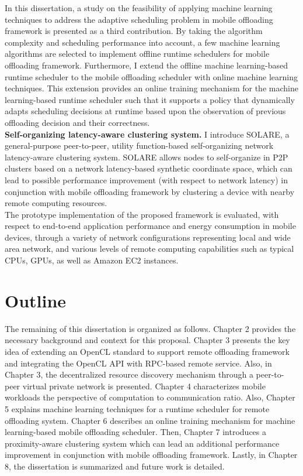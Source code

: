 %
In this dissertation, a study on the feasibility of applying machine
learning techniques to address the adaptive scheduling problem in mobile
offloading framework is presented as a third contribution.
%
By taking the algorithm complexity and scheduling performance into
account, a few machine learning algorithms are selected to implement
offline runtime schedulers for mobile offloading framework.
%
Furthermore, I extend the offline machine learning-based runtime
scheduler to the mobile offloading scheduler with online machine
learning techniques.
%
This extension provides an online training mechanism for the machine
learning-based runtime scheduler such that it supports a policy that
dynamically adapts scheduling decisions at runtime based upon the
observation of previous offloading decision and their correctness.\\
%
{\bf Self-organizing latency-aware clustering system.} I introduce
SOLARE, a general-purpose peer-to-peer, utility function-based
self-organizing network latency-aware clustering system.
%
SOLARE allows nodes to self-organize in P2P clusters based on a network
latency-based synthetic coordinate space, which can lead to possible
performance improvement (with respect to network latency) in conjunction
with mobile offloading framework by clustering a device with nearby
remote computing resources.\\ 
%
The prototype implementation of the proposed framework is evaluated,
with respect to end-to-end application performance and energy consumption
in mobile devices, through a variety of network configurations
representing local and wide area network, and various levels of remote
computing capabilities such as typical CPUs, GPUs, as well as Amazon EC2
instances.
%
\section{Outline}
\label{intro:outline}
The remaining of this dissertation is organized as follows.
%
Chapter 2 provides the necessary background and context for this
proposal.
%
Chapter 3 presents the key idea of extending an OpenCL standard to
support remote offloading framework and integrating the OpenCL API with
RPC-based remote service.
%
Also, in Chapter 3, the decentralized resource discovery mechanism
through a peer-to-peer virtual private network is presented.
%
Chapter 4 characterizes mobile workloads the perspective of computation
to communication ratio.
%
Also, Chapter 5 explains machine learning techniques for a runtime
scheduler for remote offloading system.
%
Chapter 6 describes an online training mechanism for machine
learning-based mobile offloading scheduler.
%
Then, Chapter 7 introduces a proximity-aware clustering system which can
lead an additional performance improvement in conjunction with mobile
offloading framework.
%
Lastly, in Chapter 8, the dissertation is summarized and future work
is detailed.
%
